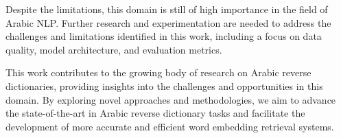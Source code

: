 \documentclass[12.5pt]{article}
\begin{document}
Despite the limitations, this domain is still of high importance in the field of Arabic NLP. Further research and experimentation are needed to address the challenges and limitations identified in this work, including a focus on data quality, model architecture, and evaluation metrics.

This work contributes to the growing body of research on Arabic reverse dictionaries, providing insights into the challenges and opportunities in this domain. By exploring novel approaches and methodologies, we aim to advance the state-of-the-art in Arabic reverse dictionary tasks and facilitate the development of more accurate and efficient word embedding retrieval systems.

\newpage

\printbibliography[title={References}]\label{lastpage}
\end{document}
